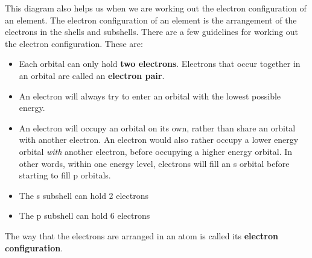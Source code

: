 \label{m38741*eip-752}This diagram also helps us when we are working out the electron configuration of an element. The electron configuration of an element is the arrangement of the electrons in the shells and subshells. There are a few guidelines for working out the electron configuration. These are:
\label{m38741*id259303}\begin{itemize}[noitemsep]
            \label{m38741*uid93}\item Each orbital can only hold \textbf{two electrons}. Electrons that occur together in an orbital are called an \textbf{electron pair}.
\label{m38741*uid94}\item An electron will always try to enter an orbital with the lowest possible energy.
\label{m38741*uid95}\item An electron will occupy an orbital on its own, rather than share an orbital with another electron. An electron would also rather occupy a lower energy orbital \textsl{with} another electron, before occupying a higher energy orbital. In other words, within one energy level, electrons will fill an s orbital before starting to fill p orbitals.
\label{m38741*uid83}\item The s subshell can hold 2 electrons
\label{m38741*uid84}\item The p subshell can hold 6 electrons
\end{itemize}
        \label{m38741*id259599}The way that the electrons are arranged in an atom is called its \textbf{electron configuration}.
        

